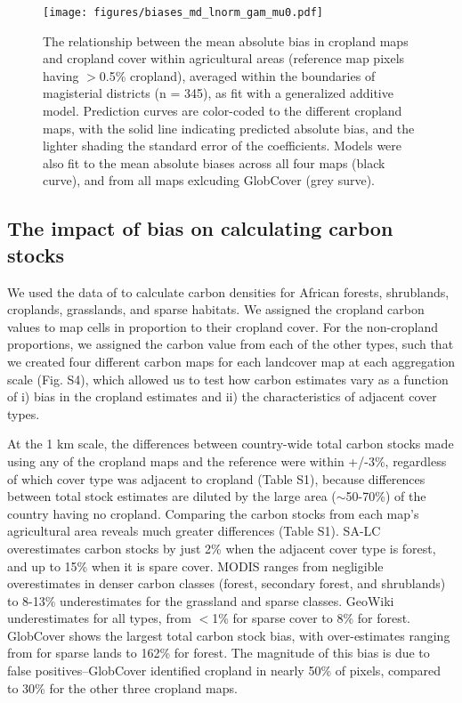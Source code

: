 \documentclass{pnastwo}
\begin{document}
\begin{article}
\vspace{-1 cm}
\begin{figure}[ht]
\centerline{\texttt{[image: figures/biases\_md\_lnorm\_gam\_mu0.pdf]}}
\caption{The relationship between the mean absolute bias in cropland maps and cropland cover within agricultural areas (reference map pixels having $>$0.5\% cropland), averaged within the boundaries of magisterial districts (n = 345), as fit with a generalized additive model. Prediction curves are color-coded to the different cropland maps, with the solid line indicating  predicted absolute bias, and the lighter shading the standard error of the coefficients. Models were also fit to the mean absolute biases across all four maps (black curve), and from all maps exlcuding GlobCover (grey surve).}
\label{afoto}
\end{figure}

\subsection{The impact of bias on calculating carbon stocks}
We used the data of \cite{ruesch_new_2008} to calculate carbon densities for African forests, shrublands, croplands, grasslands, and sparse habitats. We assigned the cropland carbon values to map cells in proportion to their cropland cover. For the non-cropland proportions, we assigned the carbon value from each of the other types, such that we created four  different carbon maps for each landcover map at each aggregation scale (Fig. S4), which allowed us to test how carbon estimates vary as a function of i) bias in the cropland estimates and ii) the characteristics of adjacent cover types. 

At the 1 km scale, the differences between country-wide total carbon stocks made using any of the cropland maps and the reference were within +/-3\%, regardless of which cover type was adjacent to cropland (Table S1), because differences between total stock estimates are diluted by the large area ($\sim$50-70\%) of the country having no cropland. Comparing the carbon stocks from each map's agricultural area reveals much greater differences (Table S1). SA-LC overestimates carbon stocks by just 2\% when the adjacent cover type is forest, and up to 15\% when it is spare cover. MODIS ranges from negligible overestimates in denser carbon classes (forest, secondary forest, and shrublands) to 8-13\% underestimates for the grassland and sparse classes. GeoWiki underestimates for all types, from $<$1\% for sparse cover to 8\% for forest. GlobCover shows the largest total carbon stock bias, with over-estimates ranging from for sparse lands to 162\% for forest. The magnitude of this bias is due to false positives--GlobCover identified cropland in nearly 50\% of pixels, compared to 30\% for the other three cropland maps. 


\end{article}
\end{document}
